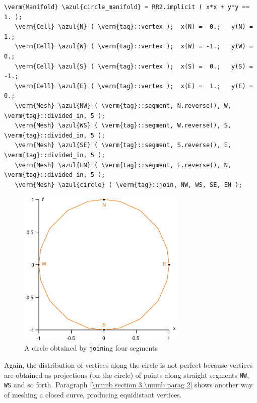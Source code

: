 \begin{Verbatim}[commandchars=\\\{\},formatcom=\small\tt,frame=single,
   label=parag-\ref{\numb section 2.\numb parag 5}.cpp,rulecolor=\color{coment},
   baselinestretch=0.94,framesep=2mm]
   \verm{Manifold} \azul{circle_manifold} = RR2.implicit ( x*x + y*y == 1. );
   \verm{Cell} \azul{N} ( \verm{tag}::vertex );  x(N) =  0.;   y(N) =  1.;
   \verm{Cell} \azul{W} ( \verm{tag}::vertex );  x(W) = -1.;   y(W) =  0.;
   \verm{Cell} \azul{S} ( \verm{tag}::vertex );  x(S) =  0.;   y(S) = -1.;
   \verm{Cell} \azul{E} ( \verm{tag}::vertex );  x(E) =  1.;   y(E) =  0.;
   \verm{Mesh} \azul{NW} ( \verm{tag}::segment, N.reverse(), W, \verm{tag}::divided_in, 5 );
   \verm{Mesh} \azul{WS} ( \verm{tag}::segment, W.reverse(), S, \verm{tag}::divided_in, 5 );
   \verm{Mesh} \azul{SE} ( \verm{tag}::segment, S.reverse(), E, \verm{tag}::divided_in, 5 );
   \verm{Mesh} \azul{EN} ( \verm{tag}::segment, E.reverse(), N, \verm{tag}::divided_in, 5 );
   \verm{Mesh} \azul{circle} ( \verm{tag}::join, NW, WS, SE, EN );
\end{Verbatim}

\begin{figure}[ht] \centering
  \includegraphics[width=80mm]{circle}
  \caption{A circle obtained by {\small\tt join}ing four segments}
  \label{\numb section 2.\numb fig 5}
\end{figure}

Again, the distribution of vertices along the circle is not perfect
because vertices are obtained as projections (on the circle) of points
along straight segments {\small\tt NW}, {\small\tt WS} and so forth.
Paragraph \ref{\numb section 3.\numb parag 2} shows another way of meshing a closed curve,
producing equidistant vertices.

